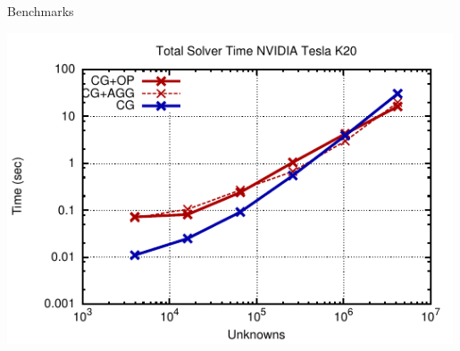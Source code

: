 \begin{frame}{Benchmarks}
  \begin{center}
   \includegraphics[width=0.99\textwidth]{figures/k20-full.pdf}
  \end{center}
\end{frame}


